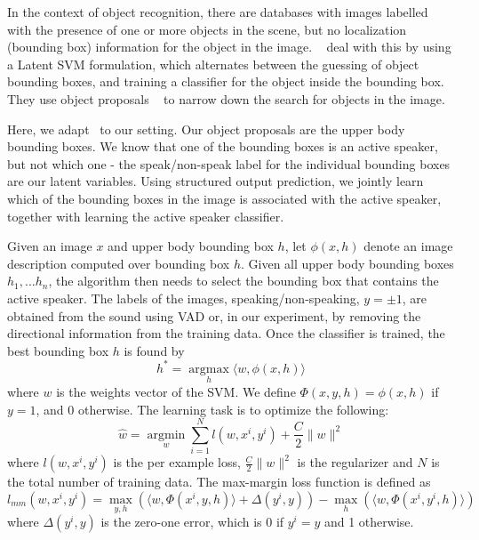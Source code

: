 \documentclass[runningheads]{llncs}
\begin{document}
In the context of object recognition, there are databases with images labelled with the presence of one or more objects in the scene, but no localization (bounding box) information for the object in the image. ~\cite{Bilen14a,Bilen14,Bilen15} deal with this by using a Latent SVM formulation, which alternates between the guessing of object bounding boxes, and training a classifier for the object inside the bounding box. They use object proposals ~\cite{Uijlings13} to narrow down the search for objects in the image. 

Here, we adapt~\cite{Bilen14a,Bilen14,Bilen15} to our setting. Our object proposals are the upper body bounding boxes. We know that one of the bounding boxes is an active speaker, but not which one - the speak/non-speak label for the individual bounding boxes are our latent variables. 
Using structured output prediction, we jointly learn which of the bounding boxes in the image is associated with the active speaker, together with learning the active speaker classifier.

Given an image $x$ and upper body bounding box $h$, let $\phi(x,h)$ denote an image description computed over bounding box $h$. 
Given all upper body bounding boxes $h_1,...h_n$, the algorithm then needs to select the bounding box that contains the active speaker.
%
The labels of the images, speaking/non-speaking, $y= \pm 1$, are obtained from the sound using VAD or, in our experiment, by removing the directional information from the training data.
%
Once the classifier is trained, the best bounding box $h$ is found by 
\begin{equation}
h^* = \underset{h}{\operatorname{argmax}}  \langle w,\phi(x,h) \rangle
\label{eq:bestBB}
\end{equation}
%
where $w$ is the weights vector of the SVM.
%
We define $\Phi(x,y,h) = \phi(x,h)$ if $y = 1$, and $0$ otherwise.
%
The learning task is to optimize the following:
\begin{equation}
\hat{w} = \underset{w}{\operatorname{argmin}} \sum_{i=1}^{N} l(w,x^i,y^i) + \frac{C}{2} \|w\| ^2
\end{equation}
%
where $l(w,x^i,y^i)$ is the per example loss, $\frac{C}{2} \|w\| ^2$ is the regularizer and $N$ is the total number of training data.
%
The max-margin loss function is defined as 
\begin{dmath}
l_{mm}(w,x^i,y^i) = \underset{y,h}{\operatorname{max}} ( \langle w,\Phi(x^i,y,h) \rangle +
\Delta(y^i,y)) - \underset{h}{\operatorname{max}} ( \langle w,\Phi(x^i,y^i,h) \rangle )
\end{dmath}
%
where $\Delta(y^i,y)$ is the zero-one error, which is $0$ if $y^i=y$ and 1 otherwise.
\end{document}
